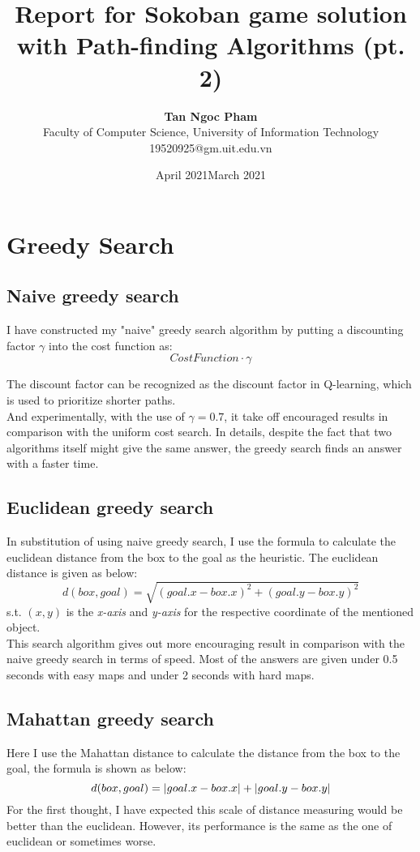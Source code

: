 \documentclass{article}
\date{April 2021}
\title{Report for Sokoban game solution with Path-finding Algorithms (pt. 2)}
\author{\textbf{Tan Ngoc Pham}\\
Faculty of Computer Science, University of Information Technology\\
\small 19520925@gm.uit.edu.vn }
\date{March 2021}
\begin{document}
\maketitle
\section{Greedy Search}

\subsection{Naive greedy search}
I have constructed my "naive" greedy search algorithm by putting a discounting factor $\gamma$ into the cost function as:
\begin{equation*}
    CostFunction \cdot \gamma
\end{equation*}

The discount factor can be recognized as the discount factor in Q-learning, which is used to prioritize shorter paths.\\

And experimentally, with the use of $\gamma = 0.7$, it take off encouraged results in comparison with the uniform cost search. In details, despite the fact that two algorithms itself might give the same answer, the greedy search finds an answer with a faster time.

\subsection{Euclidean greedy search}
In substitution of using naive greedy search, I use the formula to calculate the euclidean distance from the box to the goal as the heuristic. The euclidean distance is given as below:
\begin{equation*}
    d(box, goal) = \sqrt{(goal.x - box.x)^2 + (goal.y - box.y)^2}
\end{equation*}
s.t. $(x, y)$ is the \textit{x-axis} and \textit{y-axis} for the respective coordinate of the mentioned object.\\

This search algorithm gives out more encouraging result in comparison with the naive greedy search in terms of speed. Most of the answers are given under 0.5 seconds with easy maps and under 2 seconds with hard maps.

\subsection{Mahattan greedy search}
Here I use the Mahattan distance to calculate the distance from the box to the goal, the formula is shown as below:
\begin{equation*}
    d(box, goal) = \abs{goal.x - box.x} + \abs{goal.y - box.y}
\end{equation*}
For the first thought, I have expected this scale of distance measuring would be better than the euclidean. However, its performance is the same as the one of euclidean or sometimes worse.
\end{document}
